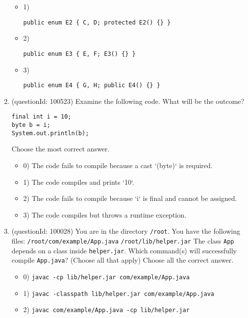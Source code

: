 \documentclass[12pt]{article}
\begin{document}
\begin{enumerate}[label=(\arabic*)]
\begin{itemize}
\item 1) \begin{verbatim}public enum E2 { C, D; protected E2() {} }\end{verbatim}

\item 2) \begin{verbatim}public enum E3 { E, F; E3() {} }\end{verbatim}

\item 3) \begin{verbatim}public enum E4 { G, H; public E4() {} }\end{verbatim}

\end{itemize}
\item (questionId: 100523) Examine the following code. What will be the outcome?
\begin{verbatim}
final int i = 10;
byte b = i;
System.out.println(b);
\end{verbatim}
Choose the most correct answer. 
\begin{itemize}
\item 0) The code fails to compile because a cast `(byte)` is required.

\item 1) The code compiles and prints `10`.

\item 2) The code fails to compile because `i` is final and cannot be assigned.

\item 3) The code compiles but throws a runtime exception.

\end{itemize}
\item (questionId: 100028) You are in the directory \verb|/root|. You have the following files:
\verb|/root/com/example/App.java|
\verb|/root/lib/helper.jar|
The class \verb|App| depends on a class inside \verb|helper.jar|. Which command(s) will successfully compile \verb|App.java|? (Choose all that apply)
Choose all the correct answer.\begin{itemize}
\item 0) \verb|javac -cp lib/helper.jar com/example/App.java|

\item 1) \verb|javac -classpath lib/helper.jar com/example/App.java|

\item 2) \verb|javac com/example/App.java -cp lib/helper.jar|


\end{itemize}
\end{enumerate}
\end{document}
